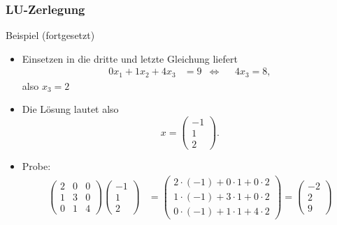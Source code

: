 \documentclass{beamer}
\renewcommand{\oe}{\"o}
\newcommand{\mytitle}{LU-Zerlegung}
\begin{document}
\begin{frame}\frametitle{\mytitle}
	\begin{block}{Beispiel (fortgesetzt)}
		\begin{itemize}
			\item Einsetzen in die dritte und letzte Gleichung liefert
				\begin{align*}
					0x_1+1x_2+4x_3&=9&\Leftrightarrow&&4x_3=8,
				\end{align*}
				also $x_3=2$
			\item Die L\oe sung lautet also $$x=\begin{pmatrix}-1\\1\\2\end{pmatrix}.$$
			\item \alert{Probe:}
				\begin{align*}
					\begin{pmatrix} 2&0&0\\ 1&3&0\\ 0&1&4 \end{pmatrix}\begin{pmatrix}-1\\1\\2\end{pmatrix}
									 &=\begin{pmatrix}
										 2\cdot(-1)+0\cdot1+0\cdot2\\
										 1\cdot(-1)+3\cdot1+0\cdot2\\
										 0\cdot(-1)+1\cdot1+4\cdot2
										 \end{pmatrix}=\begin{pmatrix}
										 -2\\2\\9
									 \end{pmatrix}
				\end{align*}
		\end{itemize}
	\end{block}
\end{frame}
\end{document}
